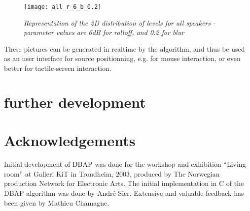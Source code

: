 \documentclass[twoside,10pt]{article}
\begin{document}
\begin{figure}[ht]
\centerline{\texttt{[image: all\_r\_6\_b\_0.2]}}
\caption{{\it Representation of the 2D distribution of levels for all speakers - parameter values are 6dB for rolloff, and 0.2 for blur}}  
\label{Level distribution for all speakers}
\end{figure}

These pictures can be generated in realtime by the algorithm, and thus be used as an user interface for source positionning, e.g. for mouse interaction, or even better for tactile-screen interaction. 

\section{further development}


\section{Acknowledgements}

Initial development of DBAP was done for the workshop and exhibition ``Living room'' at Galleri KiT in Trondheim, 2003, produced by The Norwegian production Network for Electronic Arts. The initial implementation in C of the DBAP algorithm was done by André Sier. Extensive and valuable feedback has been given by Mathieu Chamagne. 




\end{document}
